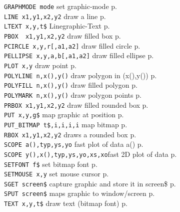 \begin{tabbing}
\verb|GRAPHMODE mode|  	\>  set graphic-mode\> p.\pageref{GRAPHMODE}\\
\verb|LINE x1,y1,x2,y2|	\> draw a line\> p.\pageref{LINE}\\
\verb|LTEXT x,y,t$|	\>  Linegraphic-Text\> p.\pageref{LTEXT}\\
\verb|PBOX  x1,y1,x2,y2|\>  draw filled box\> p.\pageref{PBOX}\\
\verb|PCIRCLE x,y,r[,a1,a2]|	\> draw filled circle\> p.\pageref{PCIRCLE}\\
\verb|PELLIPSE x,y,a,b[,a1,a2]|	\> draw filled ellipse\> p.\pageref{PELLIPSE}\\
\verb|PLOT x,y|			\> draw point\> p.\pageref{PLOT}\\
\verb|POLYLINE n,x(),y()|	\> draw polygon in (x(),y())\> p.\pageref{POLYLINE}\\
\verb|POLYFILL n,x(),y()|	\> draw filled polygon\> p.\pageref{POLYFILL}\\
\verb|POLYMARK n,x(),y()|	\> draw polygon points\> p.\pageref{POLYMARK}\\
\verb|PRBOX x1,y1,x2,y2|	\> draw filled rounded box\> p.\pageref{PRBOX}\\
\verb|PUT x,y,g$|		\> map graphic at position\> p.\pageref{PUT}\\
\verb|PUT_BITMAP t$,i,i,i,i|	\> map bitmap\> p.\pageref{PUTiBITMAP}\\
\verb|RBOX x1,y1,x2,y2|		\>draws a rounded box\> p.\pageref{RBOX}\\
\verb|SCOPE a(),typ,ys,yo|      \>fast plot of data a()\> p.\pageref{SCOPE}\\
\verb|SCOPE y(),x(),typ,ys,yo,xs,xo|\>fast 2D plot of data\> p.\pageref{SCOPE}\\
\verb|SETFONT f$|               \>set bitmap font\> p.\pageref{SETFONT}\\
\verb|SETMOUSE x,y|               \>set mouse cursor\> p.\pageref{SETMOUSE}\\
\verb|SGET screen$|		\> capture graphic and store it in screen\$\> p.\pageref{SGET}\\
\verb|SPUT screen$|		\> maps graphic to window/screen\> p.\pageref{SPUT}\\
\verb|TEXT x,y,t$|		\> draw text (bitmap font)\> p.\pageref{TEXT}\\

 \end{tabbing}
